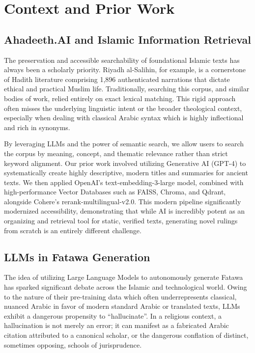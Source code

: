 \section{Context and Prior Work}

\subsection{Ahadeeth.AI and Islamic Information Retrieval}
The preservation and accessible searchability of foundational Islamic texts has always been a scholarly priority. Riyadh al-Salihin, for example, is a cornerstone of Hadith literature comprising 1,896 authenticated narrations that dictate ethical and practical Muslim life. Traditionally, searching this corpus, and similar bodies of work, relied entirely on exact lexical matching. This rigid approach often misses the underlying linguistic intent or the broader theological context, especially when dealing with classical Arabic syntax which is highly inflectional and rich in synonyms. 

By leveraging LLMs and the power of semantic search, we allow users to search the corpus by meaning, concept, and thematic relevance rather than strict keyword alignment. Our prior work involved utilizing Generative AI (GPT-4) to systematically create highly descriptive, modern titles and summaries for ancient texts. We then applied OpenAI's text-embedding-3-large model, combined with high-performance Vector Databases such as FAISS, Chroma, and Qdrant, alongside Cohere's rerank-multilingual-v2.0. This modern pipeline significantly modernized accessibility, demonstrating that while AI is incredibly potent as an organizing and retrieval tool for static, verified texts, generating novel rulings from scratch is an entirely different challenge.

\subsection{LLMs in Fatawa Generation}
The idea of utilizing Large Language Models to autonomously generate Fatawa has sparked significant debate across the Islamic and technological world. Owing to the nature of their pre-training data which often underrepresents classical, nuanced Arabic in favor of modern standard Arabic or translated texts, LLMs exhibit a dangerous propensity to ``hallucinate''. In a religious context, a hallucination is not merely an error; it can manifest as a fabricated Arabic citation attributed to a canonical scholar, or the dangerous conflation of distinct, sometimes opposing, schools of jurisprudence. 


